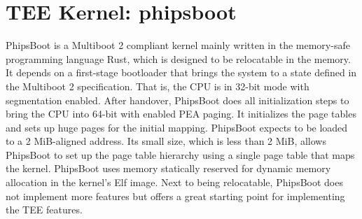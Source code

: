 

\section{TEE Kernel: phipsboot}
\label{sec:implementation:teeKernel}

PhipsBoot is a Multiboot 2 compliant kernel mainly written in the memory-safe
programming language Rust, which is designed to be relocatable in the memory. It
depends on a first-stage bootloader that brings the system to a state defined in the Multiboot 2
specification. That is, the CPU is in 32-bit mode with segmentation enabled.
After handover, PhipsBoot does all initialization steps to bring the CPU into
64-bit with enabled PEA paging. It initializes the page tables and sets up huge
pages for the initial mapping. PhipsBoot expects to be loaded to a 2 MiB-aligned
address. Its small size, which is less than 2 MiB, allows PhipsBoot to set up
the page table hierarchy using a single page table that maps the kernel.
PhipsBoot uses memory statically reserved for dynamic memory allocation in the
kernel's Elf image. Next to being relocatable, PhipsBoot does not implement more
features but offers a great starting point for implementing the TEE features. \\

